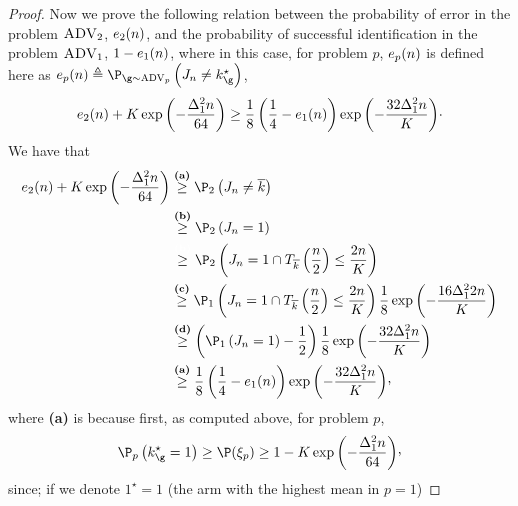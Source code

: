 \begin{proof}
	
	Now we prove the following relation 
	between the probability of error 
	in the  problem $\textsc{ADV}_2$, $e_{2}(n)$, and the
	probability of successful identification in the  problem $\textsc{ADV}_1$,
	$1-e_{1}(n)$,
	where in this case, for problem $p$, $e_{p}(n)$ 
	is defined here as $\ProErr_{p}(\timeHorizon) \triangleq
	 \Pro_{\gainVector\sim \advPro_p}\left(\recomArm_n \neq \bestArm_{\gainVector}\right)$,
		\begin{equation}\label{eq:mainlowGenAd}
	e_{2}(n)
	+K\exp\left(-\frac{\Delta^2_1n}{64}\right)
	\geq
	\frac{1}{8}\left(\frac{1}{4}-e_{1}(n) \right)
	\exp\left(-\frac{32\Delta^2_{1}n}{K}\right)\!\cdot
	\end{equation}
	We have that
	\begin{align*}
	\ProErr_{2}(\timeHorizon)
	+\nArms\exp\left(-\frac{\gap^2_1\timeHorizon}{64}\right)
	&\stackrel{\textbf{(a)}}{\geq}
	\Pro_{2}\left(\recomArm_\timeHorizon\neq \refarm\right)\\
	&\stackrel{\textbf{(b)}}{\geq}
	\Pro_{2}\left(\recomArm_\timeHorizon=1\right)\\
	&\stackrel{\textcolor{white}{\textbf{(b)}}}{\geq}
	\Pro_{2}\left(\recomArm_\timeHorizon=1 \cap \pullsNumber_{\refarm} \left(\frac{\timeHorizon}{2}\right) 
	\leq \frac{2\timeHorizon}{\nArms} \right)\\
	&\stackrel{\textbf{(c)}}{\geq}
	\Pro_{1}\left(\recomArm_\timeHorizon=1 \cap \pullsNumber_{\refarm} \left(\frac{\timeHorizon}{2}\right) 
	\leq \frac{2\timeHorizon}{\nArms} \right)\frac{1}{8}\exp\left(-\frac{16\gap^2_{1}2\timeHorizon}{\nArms}\right)\\
	&\stackrel{\textbf{(d)}}{\geq}
	\left(\Pro_{1}\left(\recomArm_\timeHorizon=1 \right)-\frac{1}{2}\right)\frac{1}{8}
	\exp\left(-\frac{32\gap^2_{1}\timeHorizon}{\nArms}\right)\\
	&\stackrel{\textbf{(a)}}{\geq}
	\frac{1}{8}\left(\frac{1}{4}-\ProErr_{1}(\timeHorizon) \right)
	\exp\left(-\frac{32\gap^2_{1}\timeHorizon}{\nArms}\right)\!\CommaBin
	\end{align*}
	where 
	\textbf{(a)} %
	is because first, as computed above, 
	for problem $p$,
	\[\Pro_{ p}\left(\bestArm_{\gainVector}=1\right)\geq \Pro(\eventc_p) 
	\geq 1-\nArms\exp\left(-\frac{\gap^2_1\timeHorizon}{64}\right)\!\CommaBin\] 
	since; if we denote $1^\star=1$ (the arm with the highest mean in $p=1$) %

\end{proof}
